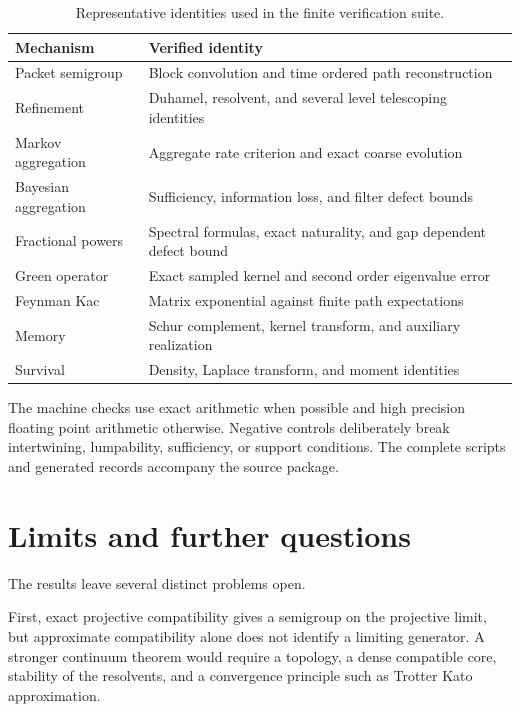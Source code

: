 \documentclass{aomart}
\theoremstyle{definition}
\theoremstyle{remark}
\begin{document}
\begin{table}
\centering
\caption{Representative identities used in the finite verification suite.}
\label{tab:verification_identities}
\begin{tabular}{>{\raggedright\arraybackslash}p{}>{\raggedright\arraybackslash}p{}}
\toprule
Mechanism & Verified identity \\
\midrule
Packet semigroup & Block convolution and time ordered path reconstruction \\
Refinement & Duhamel, resolvent, and several level telescoping identities \\
Markov aggregation & Aggregate rate criterion and exact coarse evolution \\
Bayesian aggregation & Sufficiency, information loss, and filter defect bounds \\
Fractional powers & Spectral formulas, exact naturality, and gap dependent defect bound \\
Green operator & Exact sampled kernel and second order eigenvalue error \\
Feynman Kac & Matrix exponential against finite path expectations \\
Memory & Schur complement, kernel transform, and auxiliary realization \\
Survival & Density, Laplace transform, and moment identities \\
\bottomrule
\end{tabular}
\end{table}

The machine checks use exact arithmetic when possible and high precision floating point arithmetic otherwise. Negative controls deliberately break intertwining, lumpability, sufficiency, or support conditions. The complete scripts and generated records accompany the source package.

\section{Limits and further questions}\label{sec:limits}

The results leave several distinct problems open.

First, exact projective compatibility gives a semigroup on the projective limit, but approximate compatibility alone does not identify a limiting generator. A stronger continuum theorem would require a topology, a dense compatible core, stability of the resolvents, and a convergence principle such as Trotter Kato approximation.
\end{document}
